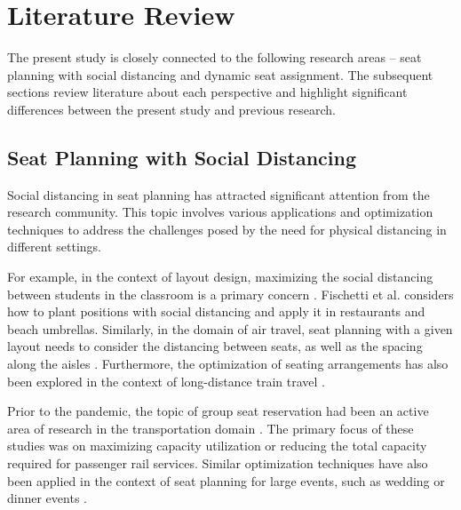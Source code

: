 \section{Literature Review}

The present study is closely connected to the following research areas -- seat planning with social distancing and dynamic seat assignment. The subsequent sections review literature about each perspective and highlight significant differences between the present study and previous research.


\subsection{Seat Planning with Social Distancing}
Social distancing in seat planning has attracted significant attention from the research community. This topic involves various applications and optimization techniques to address the challenges posed by the need for physical distancing in different settings. 

For example, in the context of layout design, maximizing the social distancing between students in the classroom is a primary concern \cite{bortolete2022support}. Fischetti et al.\cite{fischetti2021safe} considers how to plant positions with social distancing and apply it in restaurants and beach umbrellas. Similarly, in the domain of air travel, seat planning with a given layout needs to consider the distancing between seats, as well as the spacing along the aisles \cite{ghorbani2020model, salari2022social}. Furthermore, the optimization of seating arrangements has also been explored in the context of long-distance train travel \cite{haque2022optimization}.  


Prior to the pandemic, the topic of group seat reservation had been an active area of research in the transportation domain \cite{clausen2010off, deplano2019offline}. The primary focus of these studies was on maximizing capacity utilization or reducing the total capacity required for passenger rail services. Similar optimization techniques have also been applied in the context of seat planning for large events, such as wedding or dinner events \cite{lewis2016creating}. 



